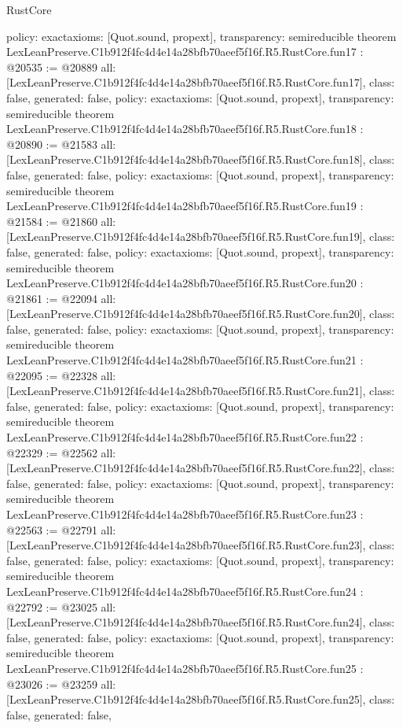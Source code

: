 \begin{lexlean}{RustCore}
\begin{coremodule}
{  policy: exact{axioms: [Quot.sound, propext]},
  transparency: semireducible
}
theorem LexLeanPreserve.C1b912f4fc4d4e14a28bfb70aeef5f16f.R5.RustCore.fun17 : @20535 := @20889 {
  all: [LexLeanPreserve.C1b912f4fc4d4e14a28bfb70aeef5f16f.R5.RustCore.fun17],
  class: false,
  generated: false,
  policy: exact{axioms: [Quot.sound, propext]},
  transparency: semireducible
}
theorem LexLeanPreserve.C1b912f4fc4d4e14a28bfb70aeef5f16f.R5.RustCore.fun18 : @20890 := @21583 {
  all: [LexLeanPreserve.C1b912f4fc4d4e14a28bfb70aeef5f16f.R5.RustCore.fun18],
  class: false,
  generated: false,
  policy: exact{axioms: [Quot.sound, propext]},
  transparency: semireducible
}
theorem LexLeanPreserve.C1b912f4fc4d4e14a28bfb70aeef5f16f.R5.RustCore.fun19 : @21584 := @21860 {
  all: [LexLeanPreserve.C1b912f4fc4d4e14a28bfb70aeef5f16f.R5.RustCore.fun19],
  class: false,
  generated: false,
  policy: exact{axioms: [Quot.sound, propext]},
  transparency: semireducible
}
theorem LexLeanPreserve.C1b912f4fc4d4e14a28bfb70aeef5f16f.R5.RustCore.fun20 : @21861 := @22094 {
  all: [LexLeanPreserve.C1b912f4fc4d4e14a28bfb70aeef5f16f.R5.RustCore.fun20],
  class: false,
  generated: false,
  policy: exact{axioms: [Quot.sound, propext]},
  transparency: semireducible
}
theorem LexLeanPreserve.C1b912f4fc4d4e14a28bfb70aeef5f16f.R5.RustCore.fun21 : @22095 := @22328 {
  all: [LexLeanPreserve.C1b912f4fc4d4e14a28bfb70aeef5f16f.R5.RustCore.fun21],
  class: false,
  generated: false,
  policy: exact{axioms: [Quot.sound, propext]},
  transparency: semireducible
}
theorem LexLeanPreserve.C1b912f4fc4d4e14a28bfb70aeef5f16f.R5.RustCore.fun22 : @22329 := @22562 {
  all: [LexLeanPreserve.C1b912f4fc4d4e14a28bfb70aeef5f16f.R5.RustCore.fun22],
  class: false,
  generated: false,
  policy: exact{axioms: [Quot.sound, propext]},
  transparency: semireducible
}
theorem LexLeanPreserve.C1b912f4fc4d4e14a28bfb70aeef5f16f.R5.RustCore.fun23 : @22563 := @22791 {
  all: [LexLeanPreserve.C1b912f4fc4d4e14a28bfb70aeef5f16f.R5.RustCore.fun23],
  class: false,
  generated: false,
  policy: exact{axioms: [Quot.sound, propext]},
  transparency: semireducible
}
theorem LexLeanPreserve.C1b912f4fc4d4e14a28bfb70aeef5f16f.R5.RustCore.fun24 : @22792 := @23025 {
  all: [LexLeanPreserve.C1b912f4fc4d4e14a28bfb70aeef5f16f.R5.RustCore.fun24],
  class: false,
  generated: false,
  policy: exact{axioms: [Quot.sound, propext]},
  transparency: semireducible
}
theorem LexLeanPreserve.C1b912f4fc4d4e14a28bfb70aeef5f16f.R5.RustCore.fun25 : @23026 := @23259 {
  all: [LexLeanPreserve.C1b912f4fc4d4e14a28bfb70aeef5f16f.R5.RustCore.fun25],
  class: false,
  generated: false,
}
\end{coremodule}
\end{lexlean}
